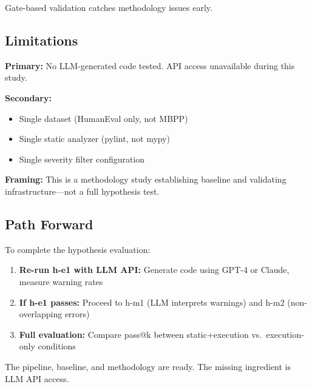 Gate-based validation catches methodology issues early.

\subsection{Limitations}

\textbf{Primary:} No LLM-generated code tested. API access unavailable during this study.

\textbf{Secondary:}
\begin{itemize}
    \item Single dataset (HumanEval only, not MBPP)
    \item Single static analyzer (pylint, not mypy)
    \item Single severity filter configuration
\end{itemize}

\textbf{Framing:} This is a methodology study establishing baseline and validating infrastructure---not a full hypothesis test.

\subsection{Path Forward}

To complete the hypothesis evaluation:

\begin{enumerate}
    \item \textbf{Re-run h-e1 with LLM API:} Generate code using GPT-4 or Claude, measure warning rates
    \item \textbf{If h-e1 passes:} Proceed to h-m1 (LLM interprets warnings) and h-m2 (non-overlapping errors)
    \item \textbf{Full evaluation:} Compare pass@k between static+execution vs.\ execution-only conditions
\end{enumerate}

The pipeline, baseline, and methodology are ready. The missing ingredient is LLM API access.
